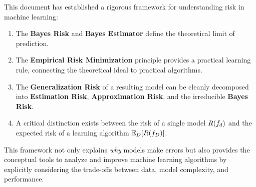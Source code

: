 \begin{notechapter}
This document has established a rigorous framework for understanding risk in machine learning:
\begin{enumerate}
    \item The \textbf{Bayes Risk} and \textbf{Bayes Estimator} define the theoretical limit of prediction.
    \item The \textbf{Empirical Risk Minimization} principle provides a practical learning rule, connecting the theoretical ideal to practical algorithms.
    \item The \textbf{Generalization Risk} of a resulting model can be cleanly decomposed into \textbf{Estimation Risk}, \textbf{Approximation Risk}, and the irreducible \textbf{Bayes Risk}.
    \item A critical distinction exists between the risk of a single model \( R(f_d) \) and the expected risk of a learning algorithm \( \mathbb{E}_D[R(f_D)] \).
\end{enumerate}

This framework not only explains \emph{why} models make errors but also provides the conceptual tools to analyze and improve machine learning algorithms by explicitly considering the trade-offs between data, model complexity, and performance.
\end{notechapter}
